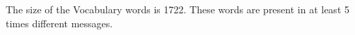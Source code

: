 \begin{answer}

The size of the Vocabulary words is 1722. These words are present in at least 5 times different messages.

\end{answer}

